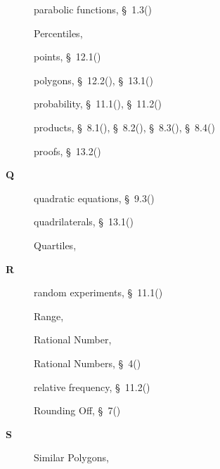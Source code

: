 \begin{multicols}{2}
{\begin{description}
	  \item[] \noindent\raggedright parabolic functions,  \S~1.3(\pageref{m39345})
	  
	  \item[] \noindent\raggedright Percentiles,  \pageref{id2624365}
	  
	  \item[] \noindent\raggedright points,  \S~12.1(\pageref{m39370})
	  
	  \item[] \noindent\raggedright polygons,  \S~12.2(\pageref{m39368}),  \S~13.1(\pageref{m39354})
	  
	  \item[] \noindent\raggedright probability,  \S~11.1(\pageref{m39377}),  \S~11.2(\pageref{m39373})
	  
	  \item[] \noindent\raggedright products,  \S~8.1(\pageref{m39383}),  \S~8.2(\pageref{m39387}),  \S~8.3(\pageref{m39394}),  \S~8.4(\pageref{m39392})
	  
	  \item[] \noindent\raggedright proofs,  \S~13.2(\pageref{m39352})
	  \vspace{.3cm}
	  \item[{\large \bfseries Q}]\noindent\raggedright
	  quadratic equations,  \S~9.3(\pageref{m39247})
	  
	  \item[] \noindent\raggedright quadrilaterals,  \S~13.1(\pageref{m39354})
	  
	  \item[] \noindent\raggedright Quartiles,  \pageref{id2622949}
	  \vspace{.3cm}
	  \item[{\large \bfseries R}]\noindent\raggedright
	  random experiments,  \S~11.1(\pageref{m39377})
	  
	  \item[] \noindent\raggedright Range,  \pageref{id2622611}
	  
	  \item[] \noindent\raggedright Rational Number,  \pageref{id2489628}
	  
	  \item[] \noindent\raggedright Rational Numbers,  \S~4(\pageref{m38348})
	  
	  \item[] \noindent\raggedright relative frequency,  \S~11.2(\pageref{m39373})
	  
	  \item[] \noindent\raggedright Rounding Off,  \S~7(\pageref{m38349})
	  \vspace{.3cm}
	  \item[{\large \bfseries S}]\noindent\raggedright
	  Similar Polygons,  \pageref{id2573375}
	  

\end{description}}
\end{multicols}
